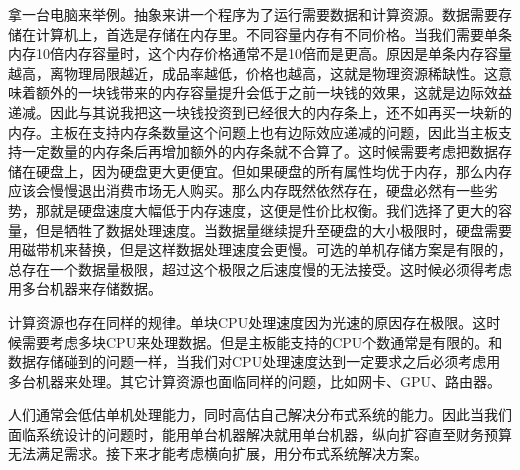 拿一台电脑来举例。抽象来讲一个程序为了运行需要数据和计算资源。数据需要存储在计算机上，首选是存储在内存里。不同容量内存有不同价格。当我们需要单条内存10倍内存容量时，这个内存价格通常不是10倍而是更高。原因是单条内存容量越高，离物理局限越近，成品率越低，价格也越高，这就是物理资源稀缺性。这意味着额外的一块钱带来的内存容量提升会低于之前一块钱的效果，这就是边际效益递减。因此与其说我把这一块钱投资到已经很大的内存条上，还不如再买一块新的内存。主板在支持内存条数量这个问题上也有边际效应递减的问题，因此当主板支持一定数量的内存条后再增加额外的内存条就不合算了。这时候需要考虑把数据存储在硬盘上，因为硬盘更大更便宜。但如果硬盘的所有属性均优于内存，那么内存应该会慢慢退出消费市场无人购买。那么内存既然依然存在，硬盘必然有一些劣势，那就是硬盘速度大幅低于内存速度，这便是性价比权衡。我们选择了更大的容量，但是牺牲了数据处理速度。当数据量继续提升至硬盘的大小极限时，硬盘需要用磁带机来替换，但是这样数据处理速度会更慢。可选的单机存储方案是有限的，总存在一个数据量极限，超过这个极限之后速度慢的无法接受。这时候必须得考虑用多台机器来存储数据。

计算资源也存在同样的规律。单块CPU处理速度因为光速的原因存在极限。这时候需要考虑多块CPU来处理数据。但是主板能支持的CPU个数通常是有限的。和数据存储碰到的问题一样，当我们对CPU处理速度达到一定要求之后必须考虑用多台机器来处理。其它计算资源也面临同样的问题，比如网卡、GPU、路由器。


人们通常会低估单机处理能力，同时高估自己解决分布式系统的能力。因此当我们面临系统设计的问题时，能用单台机器解决就用单台机器，纵向扩容直至财务预算无法满足需求。接下来才能考虑横向扩展，用分布式系统解决方案。

